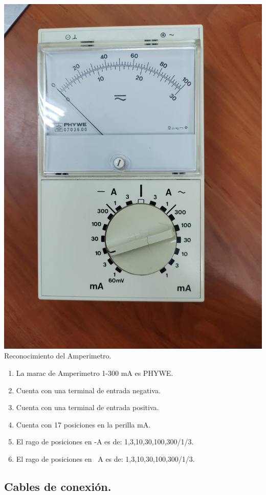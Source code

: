 \documentclass[10pt]{article}
\begin{document}
\begin{multicols}{2}
\begin{center}
\includegraphics[scale=0.1]{Amperimetro}\\
Reconocimiento del Amperimetro.
\begin{enumerate}
\item La marac de Amperimetro 1-300 mA es PHYWE.
\item Cuenta con una terminal de entrada negativa.
\item Cuenta con una terminal de entrada positiva.
\item Cuenta con 17 posiciones en la perilla mA.
\item El rago de posiciones en -A es de: 1,3,10,30,100,300/1/3.
\item El rago de posiciones en ~A es de: 1,3,10,30,100,300/1/3.
\end{enumerate}
\end{center}

\subsection{Cables de conexión.}


\end{multicols}
\end{document}
